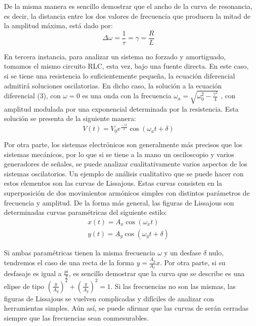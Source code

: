 \documentclass[%
 reprint,
 amsmath,amssymb,
 aps,
]{revtex4-1}
\begin{document}
De la misma manera es sencillo demostrar que el ancho de la curva de resonancia, es decir, la distancia entre los dos valores de frecuencia que producen la mitad de la amplitud m\'axima, est\'a dado por:\\

\begin{equation}
\Delta\omega = \frac{1}{\tau} = \gamma = \frac{R}{L}
\end{equation}

En tercera instancia, para analizar un sistema no forzado y amortiguado, tomamos el mismo circuito RLC, esta vez, bajo una fuente directa. En este caso, si se tiene una resistencia lo suficientemente pequeña, la ecuaci\'on diferencial admitir\'a soluciones oscilatorias. En dicho caso, la solución a la ecuaci\'on diferencial (3), con $\omega = 0$  es una onda con la frecuencia $\omega_a = \sqrt{\omega_0^2 -\frac{\gamma^2}{4}}$ , con amplitud modulada por una exponencial determinada por la resistencia. Esta soluci\'on se presenta de la siguiente manera: \cite{ondas}\\

\begin{equation}
V(t) = V_0 e^{\frac{-\gamma t}{2}}\cos(\omega_a t + \delta)
\label{equation:amortiguado}
\end{equation}

Por otra parte, los sistemas electrónicos son generalmente más precisos que los sistemas mecánicos, por lo que si se tiene a la mano un osciloscopio y varios generadores de señales, se puede analizar cualitativamente varios aspectos de los sistemas oscilatorios. Un ejemplo de análisis cualitativo que se puede hacer con estos elementos son las curvas de Lissajous. Estas curvas consisten en la superposición de dos movimientos armónicos simples con distintos parámetros de frecuencia y amplitud. De la forma más general, las figuras de Lissajous son determinadas curvas paramétricas del siguiente estilo:\\


\begin{align*}
x(t) = A_x \cos{(\omega_x t )}\\
y(t) = A_y \cos{(\omega_y t + \delta)}
\end{align*}

Si ambas param\'etricas tienen la misma frecuencia $\omega$ y un desfase $\delta$ nulo, tendremos el caso de una recta de la forma $ y = \frac{A_y}{A_x}x $. Por otra parte, si su desfasaje es igual a $\frac{pi}{2}$, es sencillo demostrar que la curva que se describe es una elipse de tipo $ (\frac{y}{A_y})^2 + (\frac{y}{A_y})^2 = 1 $. Si las frecuencias no son las mismas, las figuras de Lissajous se vuelven complicadas y difíciles de analizar con herramientas simples. Aún así, se puede afirmar que las curvas de serán cerradas siempre que las frecuencias sean conmesurables.
\end{document}
